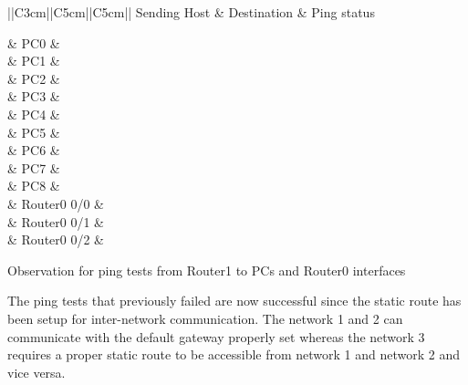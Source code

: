 \documentclass{lab_sheet}
\newcommand{\ping}[1]{
    \begin{tabular}{||C{3cm}||C{5cm}||C{5cm}||}
        \toprule
          Sending Host & Destination & Ping status\\
          \hline
          #1
          \bottomrule
       \end{tabular}
}
\begin{document}

        \begin{table}[H]
          \centering
          \ping{
             & PC0 & \multirow{12}{*}{Successful} \\
            & PC1 &\\
            & PC2 & \\
            & PC3 & \\
            & PC4 & \\
            & PC5 & \\
            & PC6 & \\
            & PC7 & \\
            & PC8 & \\
            & Router0 0/0 & \\
            & Router0 0/1 & \\
            & Router0 0/2 & \\
          }
      \caption{Observation for ping tests from Router1 to PCs and Router0 interfaces}
      \label{tbl:activityc12e}
      \end{table}

      The ping tests that previously failed are now successful since the static route has been setup for inter-network communication. The network 1 and 2 can communicate with the default gateway properly set whereas the network 3 requires a proper static route to be accessible from network 1 and network 2 and vice versa. 
\end{document}
